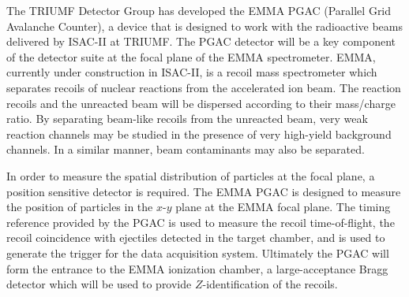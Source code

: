 The TRIUMF Detector Group has developed %
the EMMA PGAC (Parallel Grid Avalanche Counter), a device that is designed to work with the radioactive beams
delivered by ISAC-II at TRIUMF.  The PGAC detector will be a key component of the detector suite at the focal plane of the EMMA spectrometer.
EMMA, currently under construction in ISAC-II,  is a recoil mass spectrometer 
which %
 separates recoils of nuclear reactions from the accelerated ion beam.  The reaction recoils and the unreacted beam will be dispersed  according to their mass/charge ratio.  By separating beam-like recoils from the unreacted beam, very weak reaction channels may be studied in the presence of very high-yield background channels.  In a similar manner, beam contaminants may also be separated.  
 
In order to measure the spatial distribution of particles at the focal plane, a position sensitive detector is required.  The EMMA PGAC is designed to measure the position of particles in the $x$-$y$ plane at the EMMA focal plane. %
  The timing reference provided by the PGAC is used to measure the recoil time-of-flight, the recoil coincidence with ejectiles detected in the target chamber, and is used to generate the trigger for the data acquisition system.
Ultimately the PGAC will form the entrance to the EMMA ionization chamber, a large-acceptance Bragg detector which will be used to provide $Z$-identification of the  recoils.
 
